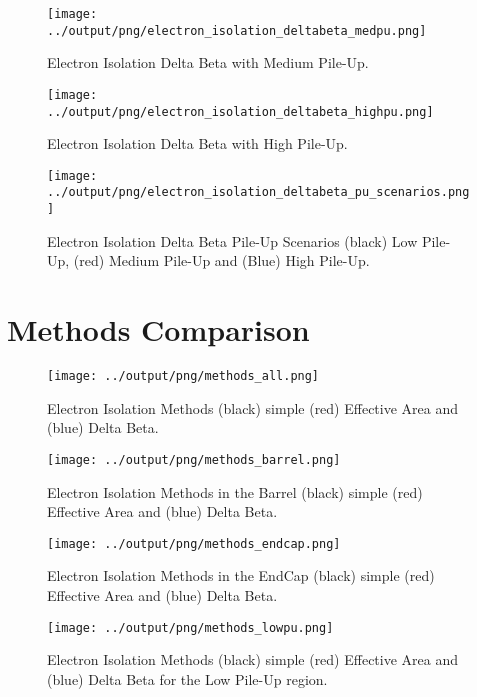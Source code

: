 \documentclass[11pt]{book}
\begin{document}
\begin{figure}[htbp]
\centering
\texttt{[image: ../output/png/electron\_isolation\_deltabeta\_medpu.png]}
\caption{Electron Isolation Delta Beta with Medium Pile-Up.}
\label{fig:electron_isolation_deltabeta_medpu}
\end{figure}

\begin{figure}[htbp]
\centering
\texttt{[image: ../output/png/electron\_isolation\_deltabeta\_highpu.png]}
\caption{Electron Isolation Delta Beta with High Pile-Up.}
\label{fig:electron_isolation_deltabeta_highpu}
\end{figure}

\begin{figure}[htbp]
\centering
\texttt{[image: ../output/png/electron\_isolation\_deltabeta\_pu\_scenarios.png]}
\caption{Electron Isolation Delta Beta Pile-Up Scenarios (black) Low Pile-Up, (red) Medium Pile-Up and (Blue) High Pile-Up.}
\label{fig:electron_isolation_deltabeta_pu_scenarios}
\end{figure}

\clearpage

\section{Methods Comparison}
\begin{figure}[ht]
\centering
\texttt{[image: ../output/png/methods\_all.png]}
\caption{Electron Isolation Methods (black) simple (red) Effective Area and (blue) Delta Beta.}
\label{fig:methods_all}
\end{figure}

\begin{figure}[ht]
\centering
\texttt{[image: ../output/png/methods\_barrel.png]}
\caption{Electron Isolation Methods in the Barrel (black) simple (red) Effective Area and (blue) Delta Beta.}
\label{fig:methods_barrel}
\end{figure}

\begin{figure}[ht]
\centering
\texttt{[image: ../output/png/methods\_endcap.png]}
\caption{Electron Isolation Methods in the EndCap (black) simple (red) Effective Area and (blue) Delta Beta.}
\label{fig:methods_endcap}
\end{figure}


\begin{figure}[ht]
\centering
\texttt{[image: ../output/png/methods\_lowpu.png]}
\caption{Electron Isolation Methods (black) simple (red) Effective Area and (blue) Delta Beta for the Low Pile-Up region.}
\label{fig:methods_lowpu}
\end{figure}
\end{document}
